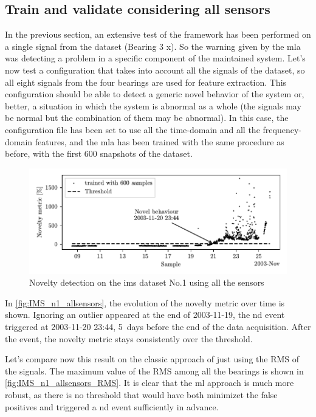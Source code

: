 \subsection{Train and validate considering all sensors}
In the previous section, an extensive test of the framework has been performed on a single signal from the dataset (Bearing 3 x). So the warning given by the \gls{mla} was detecting a problem in a specific component of the maintained system. Let's now test a configuration that takes into account all the signals of the dataset, so all eight signals from the four bearings are used for feature extraction. This configuration should be able to detect a generic novel behavior of the system or, better, a situation in which the system is abnormal as a whole (the signals may be normal but the combination of them may be abnormal).  In this case, the configuration file has been set to use all the time-domain and all the frequency-domain features, and the \gls{mla} has been trained with the same procedure as before, with the first 600 snapshots of the dataset. 


\begin{figure}
    \centering
    \includegraphics{images/IMS/Novelty_01_500samples_allsensors.pdf}
    \caption{Novelty detection on the \gls{ims} dataset No.1 using all the sensors}
    \label{fig:IMS_n1_allsensors}
\end{figure}

In \autoref{fig:IMS_n1_allsensors}, the evolution of the novelty metric over time is shown. Ignoring an outlier appeared at the end of 2003-11-19, the \gls{nd} event triggered at 2003-11-20 23:44, 5~days before the end of the data acquisition. After the event, the novelty metric stays consistently over the threshold.

Let's compare now this result on the classic approach of just using the RMS of the signals. The maximum value of the RMS among all the bearings is shown in \autoref{fig:IMS_n1_allsensors_RMS}. It is clear that the \gls{ml} approach is much more robust, as there is no threshold that would have both minimizet the false positives and triggered a \gls{nd} event sufficiently in advance.

